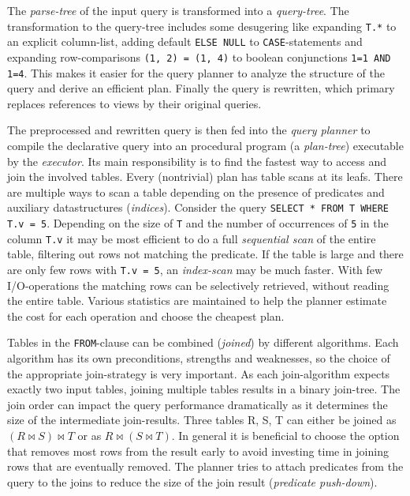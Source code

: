 The \textit{parse-tree} of the input query is transformed into a \textit{query-tree}. The transformation to the query-tree includes some desugering like expanding \texttt{T.*} to an explicit column-list, adding default \texttt{ELSE NULL} to \texttt{CASE}-statements and expanding row-comparisons \texttt{(1, 2) = (1, 4)} to boolean conjunctions \texttt{1=1 AND 1=4}. This makes it easier for the query planner to analyze the structure of the query and derive an efficient plan. Finally the query is rewritten, which primary replaces references to views by their original queries. \cite{}

The preprocessed and rewritten query is then fed into the \textit{query planner} to compile the declarative query into an procedural program (a \textit{plan-tree}) executable by the \textit{executor}. Its main responsibility is to find the fastest way to access and join the involved tables. Every (nontrivial) plan has table scans at its leafs. There are multiple ways to scan a table depending on the presence of predicates and auxiliary datastructures (\textit{indices}). Consider the query \texttt{SELECT * FROM T WHERE T.v = 5}. Depending on the size of \texttt{T} and the number of occurrences of \texttt{5} in the column \texttt{T.v} it may be most efficient to do a full \textit{sequential scan} of the entire table, filtering out rows not matching the predicate. If the table is large and there are only few rows with \texttt{T.v = 5}, an \textit{index-scan} may be much faster. With few I/O-operations the matching rows can be selectively retrieved, without reading the entire table. Various statistics are maintained to help the planner estimate the cost for each operation and choose the cheapest plan. \cite[p. 1887]{psql}


Tables in the \texttt{FROM}-clause can be combined (\textit{joined}) by different algorithms. Each algorithm has its own preconditions, strengths and weaknesses, so the choice of the appropriate join-strategy is very important. As each join-algorithm expects exactly two input tables, joining multiple tables results in a binary join-tree. The join order can impact the query performance dramatically as it determines the size of the intermediate join-results. Three tables R, S, T can either be joined as $(R \bowtie S) \bowtie T$ or as $R \bowtie (S \bowtie T)$. In general it is beneficial to choose the option that removes most rows from the result early to avoid investing time in joining rows that are eventually removed. The planner tries to attach predicates from the query to the joins to reduce the size of the join result (\textit{predicate push-down}).

